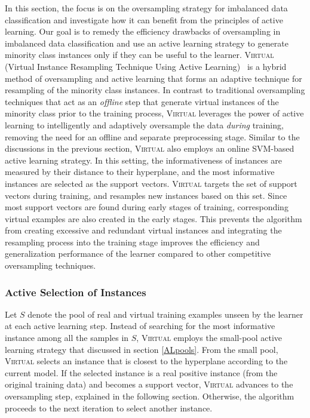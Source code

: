 In this section, the focus  is on the oversampling strategy for imbalanced data classification and investigate how it can benefit from the principles of active learning. Our goal is to remedy the efficiency drawbacks of oversampling in imbalanced data classification and use an active learning strategy to generate minority class instances only if they can be useful to the learner. \textsc{Virtual} (Virtual Instance Resampling Technique Using Active Learning)~\cite{Ertekin_dissertation} is a hybrid method of oversampling and active learning that forms an adaptive technique for resampling of the minority class instances. In contrast to traditional oversampling techniques that act as an \textit{offline} step that generate virtual instances of the minority class prior to the training process, \textsc{Virtual} leverages the power of active learning to intelligently and adaptively oversample the data \textit{during} training, removing the need for an offline and separate preprocessing stage. Similar to the discussions in the previous section, \textsc{Virtual} also employs an online SVM-based active learning strategy. In this setting, the informativeness of instances are measured by their distance to their hyperplane, and the most informative instances are selected as the support vectors. \textsc{Virtual} targets the set of support vectors during training, and resamples new instances based on this set. Since most support vectors are found during early stages of training, corresponding virtual examples are also created in the early stages. This prevents the algorithm from creating excessive and redundant virtual instances and integrating the resampling process into the training stage improves the efficiency and generalization performance of the learner compared to other competitive oversampling techniques.

\subsubsection{Active Selection of Instances}

Let $S$ denote the pool of real and virtual training examples unseen by the learner at each active learning step. Instead of searching for the most informative instance among all the samples in $S$, \textsc{Virtual} employs the small-pool active learning strategy that discussed in section \ref{ALpools}. From the small pool, \textsc{Virtual} selects an instance that is closest to the hyperplane according to the current model. If the selected instance is a real positive instance (from the original training data) and becomes a support vector, \textsc{Virtual} advances to the oversampling step, explained in the following section. Otherwise, the algorithm proceeds to the next iteration to select another instance.


